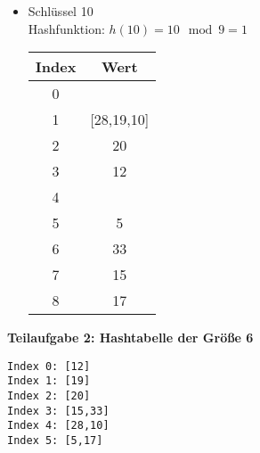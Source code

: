 \begin{multicols}{2}
\begin{itemize}
\columnbreak
\item Schlüssel 10\\
Hashfunktion: $h(10) = 10 \mod 9 = 1$

\begin{center}
\begin{tabular}{c|c}
Index & Wert \\
\hline
0 & \\
1 & [28,19,10]\\
2 & 20\\
3 & 12\\
4 & \\
5 & 5\\
6 & 33\\
7 & 15\\
8 & 17\\
\end{tabular}
\end{center}
\end{itemize}
\end{multicols}

\noindent
\textbf{Teilaufgabe 2: Hashtabelle der Größe 6}
\begin{verbatim}
Index 0: [12]
Index 1: [19]
Index 2: [20]
Index 3: [15,33]
Index 4: [28,10]
Index 5: [5,17]
\end{verbatim}
